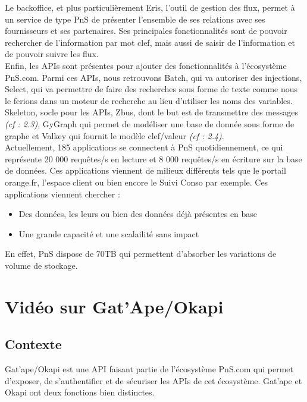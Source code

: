 Le backoffice, et plus particulièrement Eris, l'outil de gestion des flux, permet à un service de type PnS de présenter l'ensemble de ses relations avec ses fournisseurs et ses partenaires. Ses principales fonctionnalités sont de pouvoir rechercher de l'information par mot clef, mais aussi de saisir de l'information et de pouvoir suivre les flux.\\

Enfin, les APIs sont présentes pour ajouter des fonctionnalités à l'écosystème PnS.com. Parmi ces APIs, nous retrouvons Batch, qui va autoriser des injections, Select, qui va permettre de faire des recherches sous forme de texte comme nous le ferions dans un moteur de recherche au lieu d'utiliser les noms des variables. Skeleton, socle pour les APIs, Zbus, dont le but est de transmettre des messages \textit{(cf : 2.3)}, GyGraph qui permet de modéliser une base de donnée sous forme de graphe et Valkey qui fournit le modèle clef/valeur \textit{(cf : 2.4)}.\\

Actuellement, 185 applications se connectent à PnS quotidiennement, ce qui représente 20 000 requêtes/s en lecture et 8 000 requêtes/s en écriture sur la base de données. Ces applications viennent de milieux différents tels que le portail orange.fr, l'espace client ou bien encore le Suivi Conso par exemple. Ces applications viennent chercher : 

\begin{itemize}
\item Des données, les leurs ou bien des données déjà présentes en base
\item Une grande capacité et une scalailité sans impact
\end{itemize}
 
 En effet, PnS dispose de 70TB qui permettent d'absorber les variations de volume de stockage.

\section{Vidéo sur Gat'Ape/Okapi}

\subsection{Contexte}
Gat'ape/Okapi est une API faisant partie de l'écosystème PnS.com qui permet d'exposer, de s'authentifier et de sécuriser les APIs de cet écosystème. Gat'ape et Okapi ont deux fonctions bien distinctes.\\

